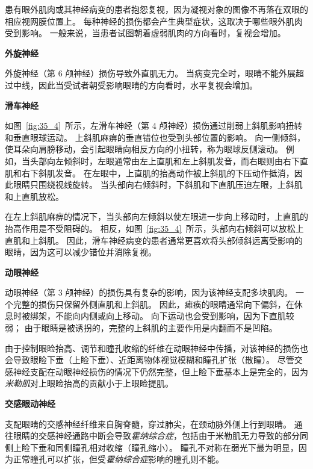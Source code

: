 \begin{proposition}[眼外肌肉或神经损伤] \label{box:35_1}

\quad \quad 患有眼外肌肉或其神经病变的患者抱怨复视，因为凝视对象的图像不再落在双眼的相应视网膜位置上。
每种神经的损伤都会产生典型症状，这取决于哪些眼外肌肉受到影响。
一般来说，当患者试图朝着虚弱肌肉的方向看时，复视会增加。


\textbf{外旋神经}

\quad \quad 外旋神经（第 6 颅神经）损伤导致外直肌无力。
当病变完全时，眼睛不能外展超过中线，因此当受试者朝受影响眼睛的方向看时，水平复视会增加。


\textbf{滑车神经}

\quad \quad 如图~\ref{fig:35_4}~所示，左滑车神经（第 4 颅神经）损伤通过削弱上斜肌影响扭转和垂直眼球运动。
上斜肌麻痹的垂直错位也受到头部位置的影响。
向一侧倾斜，使耳朵向肩膀移动，会引起眼睛向相反方向的小扭转，称为眼球反侧滚动。
例如，当头部向左倾斜时，左眼通常由左上直肌和左上斜肌发音，而右眼则由右下直肌和右下斜肌发音。
在左眼中，上直肌的抬高动作被上斜肌的下压动作抵消，因此眼睛只围绕视线旋转。
当头部向右倾斜时，下斜肌和下直肌压迫左眼，上斜肌和上直肌放松。


\quad \quad 在左上斜肌麻痹的情况下，当头部向左倾斜以使左眼进一步向上移动时，上直肌的抬高作用是不受阻碍的。
相反，如图~\ref{fig:35_4}~所示，头部向右倾斜可以放松上直肌和上斜肌。
因此，滑车神经病变的患者通常更喜欢将头部倾斜远离受影响的眼睛，因为这可以减少错位并消除复视。


\textbf{动眼神经}

\quad \quad 动眼神经（第 3 颅神经）的损伤具有复杂的影响，因为该神经支配多块肌肉。
一个完整的损伤只保留外侧直肌和上斜肌。
因此，瘫痪的眼睛通常向下偏斜，在休息时被绑架，不能向内侧或向上移动。
向下运动也会受到影响，因为下直肌较弱；
由于眼睛是被诱拐的，完整的上斜肌的主要作用是内翻而不是凹陷。


\quad \quad 由于控制眼睑抬高、调节和瞳孔收缩的纤维在动眼神经中传播，对该神经的损伤也会导致眼睑下垂（上睑下垂）、近距离物体视觉模糊和瞳孔扩张（散瞳）。
尽管交感神经支配在动眼神经损伤的情况下仍然完整，但上睑下垂基本上是完全的，因为\textit{米勒肌}对上眼睑抬高的贡献小于上眼睑提肌。


\textbf{交感眼动神经}

\quad \quad 支配眼睛的交感神经纤维来自胸脊髓，穿过肺尖，在颈动脉外侧上行到眼睛。
通往眼睛的交感神经通路中断会导致\textit{霍纳综合症}，包括由于米勒肌无力导致的部分同侧上睑下垂和同侧瞳孔相对收缩（瞳孔缩小）。
瞳孔不对称在弱光下最为明显，因为正常瞳孔可以扩张，但受\textit{霍纳综合症}影响的瞳孔则不能。
	
\end{proposition}


